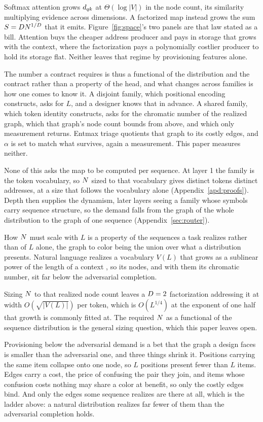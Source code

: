 Softmax attention grows $d_{qk}$ at $\Theta(\log |V|)$ in the node count, its similarity multiplying evidence across dimensions. A factorized map instead grows the sum $S = D N^{1/D}$ that it emits. Figure~\ref{fig:space}'s two panels are that law stated as a bill. Attention buys the cheaper address producer and pays in storage that grows with the context, where the factorization pays a polynomially costlier producer to hold its storage flat. Neither leaves that regime by provisioning features alone.

The number a contract requires is thus a functional of the distribution and the contract rather than a property of the head, and what changes across families is how one comes to know it. A disjoint family, which positional encoding constructs, asks for $L$, and a designer knows that in advance. A shared family, which token identity constructs, asks for the chromatic number of the realized graph, which that graph's node count bounds from above, and which only measurement returns. Entmax triage quotients that graph to its costly edges, and $\alpha$ is set to match what survives, again a measurement. This paper measures neither.

None of this asks the map to be computed per sequence. At layer 1 the family is the token vocabulary, so $N$ sized to that vocabulary gives distinct tokens distinct addresses, at a size that follows the vocabulary alone (Appendix~\ref{apd:proofs}). Depth then supplies the dynamism, later layers seeing a family whose symbols carry sequence structure, so the demand falls from the graph of the whole distribution to the graph of one sequence (Appendix~\ref{sec:router}).

How $N$ must scale with $L$ is a property of the sequences a task realizes rather than of $L$ alone, the graph to color being the union over what a distribution presents. Natural language realizes a vocabulary $V(L)$ that grows as a sublinear power of the length of a context \citep{heaps1978}, so its nodes, and with them its chromatic number, sit far below the adversarial completion.

Sizing $N$ to that realized node count leaves a $D = 2$ factorization addressing it at width $O(\sqrt{|V(L)|})$ per token, which is $O(L^{1/4})$ at the exponent of one half that growth is commonly fitted at. The required $N$ as a functional of the sequence distribution is the general sizing question, which this paper leaves open.

Provisioning below the adversarial demand is a bet that the graph a design faces is smaller than the adversarial one, and three things shrink it. Positions carrying the same item collapse onto one node, so $L$ positions present fewer than $L$ items. Edges carry a cost, the price of confusing the pair they join, and items whose confusion costs nothing may share a color at benefit, so only the costly edges bind. And only the edges some sequence realizes are there at all, which is the ladder above: a natural distribution realizes far fewer of them than the adversarial completion holds.

